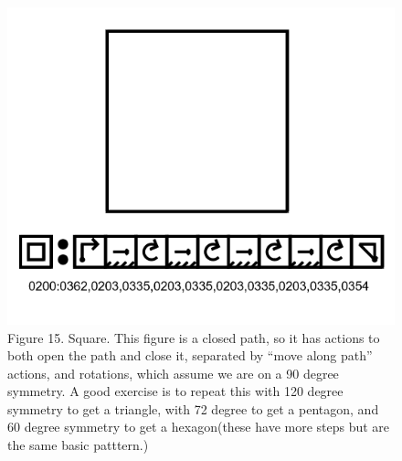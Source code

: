 \documentclass[11pt]{article}
\begin{document}
\begin{figure}

\includegraphics[width=\linewidth]{figures/figure15_square.png}

\caption{Figure 15. Square.  This figure is a closed path, so it has actions to both open the path and close it, separated by ``move along path'' actions, and rotations, which assume we are on a 90 degree symmetry.  A good exercise is to repeat this with 120 degree symmetry to get a triangle, with 72 degree to get a pentagon, and 60 degree symmetry to get a hexagon(these have more steps but are the same basic patttern.)}
\end{figure}
\end{document}

